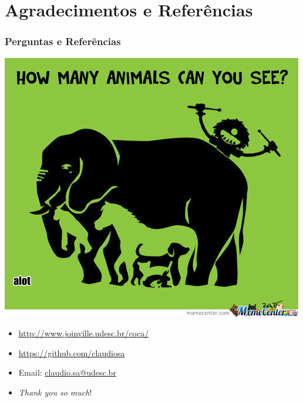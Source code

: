 \documentclass{beamer}
\begin{document}


\section{Agradecimentos e Referências}

\begin{frame} [allowframebreaks=0.9]
\frametitle{Perguntas e Referências}
  
  \begin{center}
   \includegraphics[scale=0.35,keepaspectratio]{test_intelligence01.jpg} 
  \end{center} 

\vspace{-1cm}

\begin{block}{}
  \begin{itemize}
  \item \url{http://www.joinville.udesc.br/coca/}
  
  \item \url{https://github.com/claudiosa}

  \item Email: \url{claudio.sa@udesc.br}


  \item \textit{Thank you so much}!

  \end{itemize}
  \end{block}

\end{frame}


\end{document}

